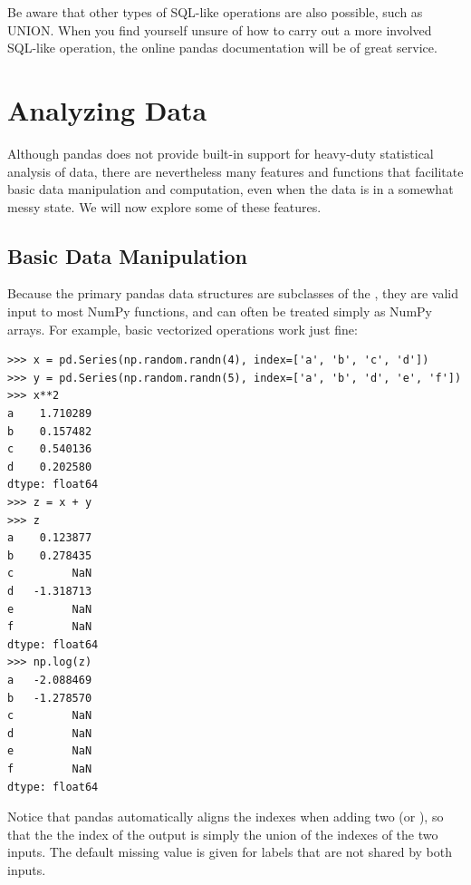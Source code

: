 Be aware that other types of SQL-like operations are also possible, such as UNION.
When you find yourself unsure of how to carry out a more involved SQL-like operation, the online
pandas documentation will be of great service.

\section*{Analyzing Data}
Although pandas does not provide built-in support for heavy-duty statistical analysis of data, there
are nevertheless many features and functions that facilitate basic data manipulation and computation,
even when the data is in a somewhat messy state. We will now explore some of these features.

\subsection*{Basic Data Manipulation}
Because the primary pandas data structures are subclasses of the , they are valid input
to most NumPy functions, and can often be treated simply as NumPy arrays. For example, basic
vectorized operations work just fine:
\begin{lstlisting}
>>> x = pd.Series(np.random.randn(4), index=['a', 'b', 'c', 'd'])
>>> y = pd.Series(np.random.randn(5), index=['a', 'b', 'd', 'e', 'f'])
>>> x**2
a    1.710289
b    0.157482
c    0.540136
d    0.202580
dtype: float64
>>> z = x + y
>>> z
a    0.123877
b    0.278435
c         NaN
d   -1.318713
e         NaN
f         NaN
dtype: float64
>>> np.log(z)
a   -2.088469
b   -1.278570
c         NaN
d         NaN
e         NaN
f         NaN
dtype: float64
\end{lstlisting}
Notice that pandas automatically aligns the indexes when adding two  (or ),
so that the the index of the output is simply the union of the indexes of the two inputs. The default
missing value  is given for labels that are not shared by both inputs.

